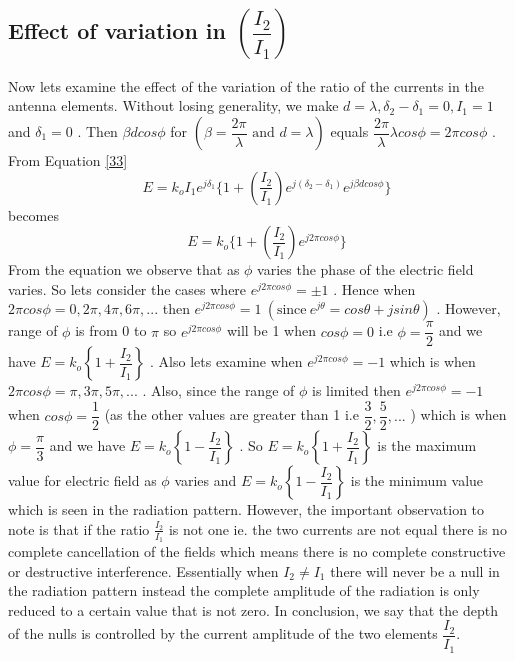 \subsection{Effect of variation in $ \left( \dfrac{I_2}{I_1} \right) $ } 
Now lets examine the effect of the variation of the ratio of the currents in the antenna elements. Without losing generality, we make $ d = \lambda ,  \delta_2 - \delta_1 = 0 , I_1 =1 $ and $\delta_1 = 0 $ . Then $ \beta dcos\phi $ for $ ( \beta = \dfrac{2 \pi}{\lambda} \text{ and }  d = \lambda) $ equals $ \dfrac{2 \pi}{ \lambda } \lambda cos \phi = 2 \pi cos \phi $ . From Equation \ref{33}
$$
\quad  E = k_o I_1 e^{j \delta_1} \{1 + \left( \dfrac{I_2}{I_1}\right) e^{j( \delta_2 - \delta_1)} e^{j \beta dcos\phi}\} 
$$
becomes
\begin{equation}
\quad E = k_o \{ 1 +  \left(\dfrac{I_2}{I_1}\right) e^{j 2 \pi cos\phi}  \}
\end{equation}
From the equation we observe that as $ \phi $ varies  the phase of the electric field varies. So lets consider the cases where $ e^{j 2 \pi cos\phi} = \pm 1 $ . Hence when $ 2 \pi cos\phi = 0, 2 \pi, 4 \pi, 6 \pi, ... $ then  $ e^{j 2 \pi cos\phi} = 1\ (\text{since}\ e^{j \theta} = cos\theta + j sin\theta) $ . However, range of $ \phi $ is from 0 to $ \pi $ so $ e^{j 2 \pi cos\phi} $ will be 1 when $ cos\phi = 0 $ i.e $ \phi = \dfrac{ \pi }{ 2 } $ and we have $ E  = k_o \left\{ 1 + \dfrac{I_2}{I_1} \right\} $ .
Also lets examine when  $ e^{j 2 \pi cos\phi} = - 1 $ which is when $ 2 \pi cos\phi = \pi, 3 \pi, 5 \pi,... $ . Also, since the range of $ \phi $ is limited then $ e^{j 2 \pi cos\phi} = - 1 $ when $ cos\phi = \dfrac{ 1 }{ 2 } $ (as the other values are greater than 1 i.e $ \dfrac{ 3 }{ 2 }, \dfrac{ 5 }{ 2 }, ... $ ) which is when $ \phi = \dfrac{ \pi }{ 3 } $ and we have $ E  = k_o \left\{ 1 - \dfrac{I_2}{I_1} \right\} $ . So $ E  = k_o \left\{ 1 + \dfrac{I_2}{I_1} \right\} $ is the maximum value for electric field as  $ \phi $ varies and $ E  = k_o \left\{ 1 - \dfrac{I_2}{I_1} \right\} $ is the minimum value which is seen in the radiation pattern. However, the important observation to note is that if the ratio $\frac{I_2}{I_1}$ is not one ie. the two currents are not equal there is no complete cancellation of the fields which means there is no complete constructive or destructive interference. Essentially when $ I_2 \neq I_1 $ there will never be a null in the radiation pattern instead the complete amplitude of the radiation is only reduced to a certain value that is not zero. In conclusion, we say that the depth of the nulls is controlled by the current amplitude of the two elements $ \dfrac{ I_2 }{ I_1 } $.

